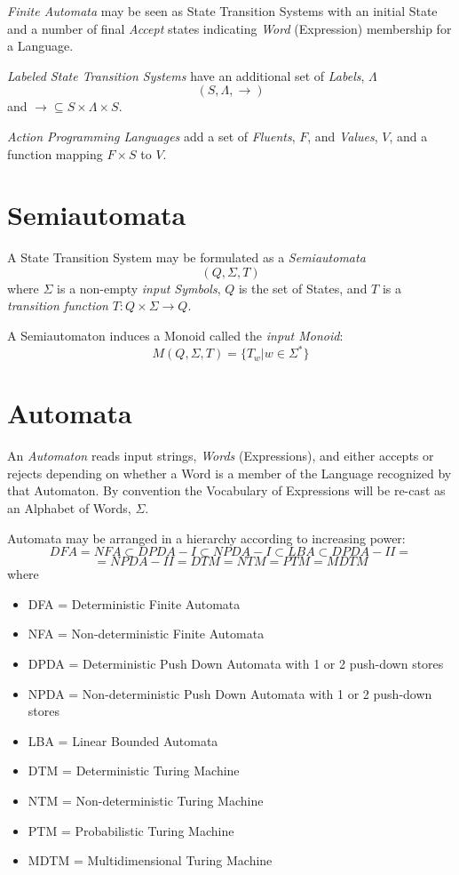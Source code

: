 \documentclass{article}
\begin{document}
\emph{Finite Automata} may be seen as State Transition Systems with an
initial State and a number of final \emph{Accept} states indicating
\emph{Word} (Expression) membership for a Language.

\emph{Labeled State Transition Systems} have an additional set of
\emph{Labels}, $\Lambda$
\[(S,\Lambda,\rightarrow)\]
and $\rightarrow \subseteq S \times \Lambda \times S$.

\emph{Action Programming Languages} add a set of \emph{Fluents}, $F$, and
\emph{Values}, $V$, and a function mapping $F \times S$ to $V$.



\section{Semiautomata}

A State Transition System may be formulated as a \emph{Semiautomata}
\[
    (Q,\Sigma,T)
\]
where $\Sigma$ is a non-empty \emph{input Symbols}, $Q$ is the set of
States, and $T$ is a \emph{transition function} $T:Q \times \Sigma
\rightarrow Q$.

A Semiautomaton induces a Monoid called the \emph{input Monoid}:
\[
    M(Q,\Sigma,T) = \{T_w | w \in \Sigma^*\}
\]



\section{Automata} \label{subsec:automata}

An \emph{Automaton} reads input strings, \emph{Words} (Expressions),
and either accepts or rejects depending on whether a Word is a member
of the Language recognized by that Automaton. By convention the
Vocabulary of Expressions will be re-cast as an Alphabet of Words,
$\Sigma$.

Automata may be arranged in a hierarchy according to increasing power:
\[
    DFA = NFA \subset DPDA-I \subset NPDA-I \subset LBA \subset DPDA-II =
\]\[
    = NPDA-II = DTM = NTM = PTM = MDTM
\]
where
\begin{itemize}
\item DFA = Deterministic Finite Automata
\item NFA = Non-deterministic Finite Automata
\item DPDA = Deterministic Push Down Automata with 1
  or 2 push-down stores
\item NPDA = Non-deterministic Push Down Automata
  with 1 or 2 push-down stores
\item LBA = Linear Bounded Automata
\item DTM = Deterministic Turing Machine
\item NTM = Non-deterministic Turing Machine
\item PTM = Probabilistic Turing Machine
\item MDTM = Multidimensional Turing Machine
\end{itemize}
\end{document}
